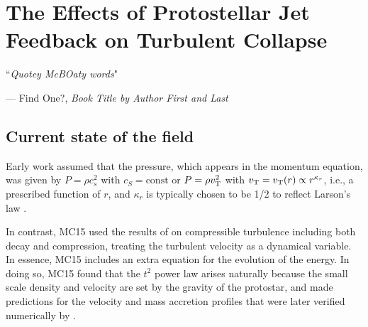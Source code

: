 \documentclass[../dissertation.tex]{subfiles}
\begin{document}
\chapter[Jet Feedback in Star Formation]{The Effects of Protostellar Jet Feedback on Turbulent Collapse}
\label{ch:jet}


\singlespace
\epigraph{``\emph{Quotey McBOaty words}"}{--- \textup{Find One?}, \textit{Book Title by Author First and Last}}

\dblspace

%

\section{Current state of the field}

Early work \citep{1977ApJ...214..488S,1992ApJ...396..631M,1997ApJ...476..750M} assumed that the pressure, which appears in the momentum equation, was given by $P = \rho c_s^2$ with $c_S = \textrm{const}$ or $P = \rho v_{\rm T}^2$ with $v_{\rm T} = v_{\rm T}(r) \propto r^{\kappa_r}$, i.e., a prescribed function of $r$, and $\kappa_r$ is typically chosen to be 1/2 to reflect Larson's law \citep{1981MNRAS.194..809L}.

In contrast,  MC15 used the results of \citet{2012ApJ...750L..31R} on compressible turbulence including both decay and compression, treating the turbulent velocity as a dynamical variable.  In essence, MC15 includes an extra equation for the evolution of the energy.
In doing so, MC15 found that the $t^2$ power law arises naturally because the small scale density and velocity are set by the gravity of the protostar, and made predictions for the velocity and mass accretion profiles that were later verified numerically by \citet{2017MNRAS.465.1316M}.
\end{document}
